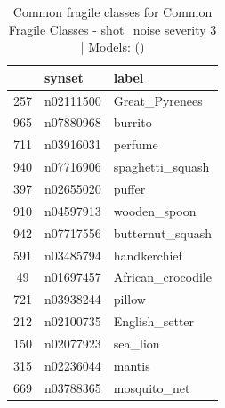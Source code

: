 \begin{table}
\caption{Common fragile classes for Common Fragile Classes - shot_noise severity 3 | Models: ()}
\label{tab:Common Fragile Classes - shot_noise severity 3_d41d8cd9}
\begin{tabular}{cll}
\toprule
 & synset & label \\
\midrule
257 & n02111500 & Great_Pyrenees \\
965 & n07880968 & burrito \\
711 & n03916031 & perfume \\
940 & n07716906 & spaghetti_squash \\
397 & n02655020 & puffer \\
910 & n04597913 & wooden_spoon \\
942 & n07717556 & butternut_squash \\
591 & n03485794 & handkerchief \\
49 & n01697457 & African_crocodile \\
721 & n03938244 & pillow \\
212 & n02100735 & English_setter \\
150 & n02077923 & sea_lion \\
315 & n02236044 & mantis \\
669 & n03788365 & mosquito_net \\
\bottomrule
\end{tabular}
\end{table}
